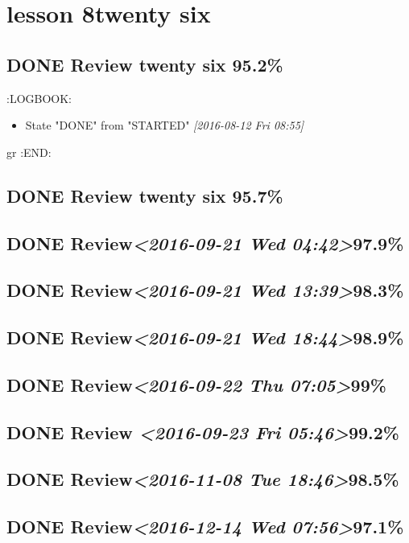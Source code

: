 \documentclass[11pt]{ctexart}
\begin{document}
\section{lesson 8twenty six}
\label{sec:org0e35d72}
\subsection{{\bfseries\sffamily DONE} Review twenty six 95.2\%}
\label{sec:orgecda9ad}
:LOGBOOK:
\begin{itemize}
\item State "DONE"       from "STARTED"    \textit{[2016-08-12 Fri 08:55]}
\end{itemize}
gr  :END:
\subsection{{\bfseries\sffamily DONE} Review twenty six 95.7\%}
\label{sec:orge68bf10}

\subsection{{\bfseries\sffamily DONE} Review\textit{<2016-09-21 Wed 04:42>}97.9\%}
\label{sec:org029e0c7}
\subsection{{\bfseries\sffamily DONE} Review\textit{<2016-09-21 Wed 13:39>}98.3\%}
\label{sec:org824450b}
\subsection{{\bfseries\sffamily DONE} Review\textit{<2016-09-21 Wed 18:44>}98.9\%}
\label{sec:orgfe89847}
\subsection{{\bfseries\sffamily DONE} Review\textit{<2016-09-22 Thu 07:05>}99\%}
\label{sec:org1e732fc}
\subsection{{\bfseries\sffamily DONE} Review \textit{<2016-09-23 Fri 05:46>}99.2\%}
\label{sec:org7f09a68}
\subsection{{\bfseries\sffamily DONE} Review\textit{<2016-11-08 Tue 18:46>}98.5\%}
\label{sec:org4a1014c}
\subsection{{\bfseries\sffamily DONE} Review\textit{<2016-12-14 Wed 07:56>}97.1\%}
\label{sec:org8185504}
\end{document}

